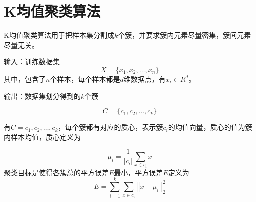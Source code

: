\section{K均值聚类算法}

K均值聚类算法\cite{K_Means_1979}用于把样本集分割成${k}$个簇，并要求簇内元素尽量密集，簇间元素尽量无关。

输入：训练数据集
\begin{equation}
	X=\{x_1,x_2,\ldots,x_n\}
\end{equation}
其中，包含了${n}$个样本，每个样本都是${d}$维数据点，有${x_i \in R^d}$。

输出：数据集划分得到的${k}$个簇

\begin{equation}
	C=\{c_1, c_2, \ldots, c_k\}
\end{equation}

有${C=c_1, c_2, \ldots, c_k}$，每个簇都有对应的质心，表示簇${c_i}$的均值向量，质心的值为簇内样本均值，质心定义为

\begin{equation}
	\mu_i=\frac{1}{\left|c_i\right|}\sum_{x\in c_i} x
\end{equation}
聚类目标是使得各簇总的平方误差${E}$最小，平方误差${E}$定义为
\begin{equation}
	E=\sum_{i=1}^{k}\sum_{x\in c_i}\left|\left|x-\mu_i\right|\right|_2^2
\end{equation}


